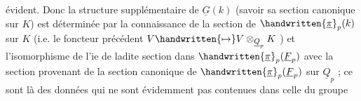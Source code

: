 évident. Donc la structure supplémentaire de $\underline{G}(k)$ (savoir sa section  canonique sur $K$) est déterminée par la connaissance de la section de $\handwritten{\underline{\pi}}_p(k)$ sur $K$ (i.e. le foncteur précédent $V\handwritten{\mapsto}V\otimes_{\underline{Q}_p}K$ ) et l'isomorphisme de l'ie de ladite section dans $\handwritten{\underline{\pi}}_p(\underline{F}_p)$ avec la section provenant de la section canonique de $\handwritten{\underline{\pi}}_p(\underline{F}_p)$ sur $\underline{Q}_p$ ; ce sont là des données qui ne sont évidemment pas contenues dans celle du groupe

